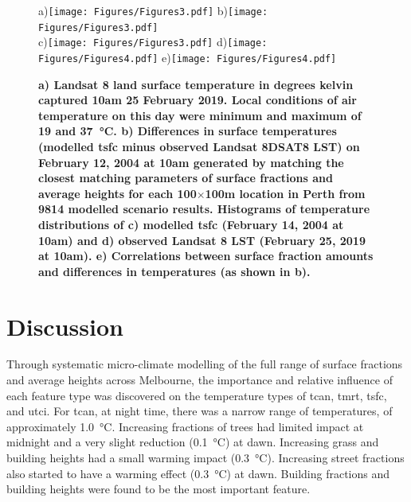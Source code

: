 \documentclass[final,3p,times,authoryear]{elsarticle}
\begin{document}
\begin{figure} 
\centering
a)\texttt{[image: Figures/Figures3.pdf]}
b)\texttt{[image: Figures/Figures3.pdf]}\\
c)\texttt{[image: Figures/Figures3.pdf]}
d)\texttt{[image: Figures/Figures4.pdf]}
e)\texttt{[image: Figures/Figures4.pdf]}
\caption{\bf a) Landsat 8 land surface temperature in degrees kelvin captured 10am 25 February 2019. Local conditions of air temperature on this day were minimum and maximum of 19 and 37\SI{}{\degreeCelsius}. b) Differences in surface temperatures (modelled \gls{tsfc} minus observed Landsat 8DSAT8 LST) on February 12, 2004 at 10am generated by matching the closest matching parameters of surface fractions and average heights for each 100$\times$100m location in Perth from 9814 modelled scenario results. Histograms of temperature distributions of c) modelled \gls{tsfc} (February 14, 2004 at 10am) and d) observed Landsat 8 LST (February 25, 2019 at 10am). e) Correlations between surface fraction amounts and differences in temperatures (as shown in b). }
 \label{fig:Perth-Landsat-LST-25-02-2019}
 \label{fig:Perth-Landsat-TSFC-LST-25-02-2019}
 \label{fig:Perth_TSFC14_85}
\end{figure}








\section{Discussion}\label{sec:discussion}

Through systematic micro-climate modelling of the full range of surface fractions and average heights across Melbourne, the importance and relative influence of each feature type was discovered on the temperature types of \gls{tcan}, \gls{tmrt}, \gls{tsfc}, and \gls{utci}. For \gls{tcan}, at night time, there was a narrow range of temperatures, of approximately 1.0\SI{}{\degreeCelsius}. Increasing fractions of trees had limited impact at midnight and a very slight reduction (0.1\SI{}{\degreeCelsius}) at dawn. Increasing grass and building heights had a small warming impact (0.3\SI{}{\degreeCelsius}). Increasing street fractions also started to have a warming effect (0.3\SI{}{\degreeCelsius}) at dawn. Building fractions and building heights were found to be the most important feature.
\end{document}

